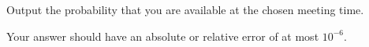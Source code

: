 
    Output the probability that you are available at the chosen meeting time.

    Your answer should have an absolute or relative error of at most $10^{-6}$.
